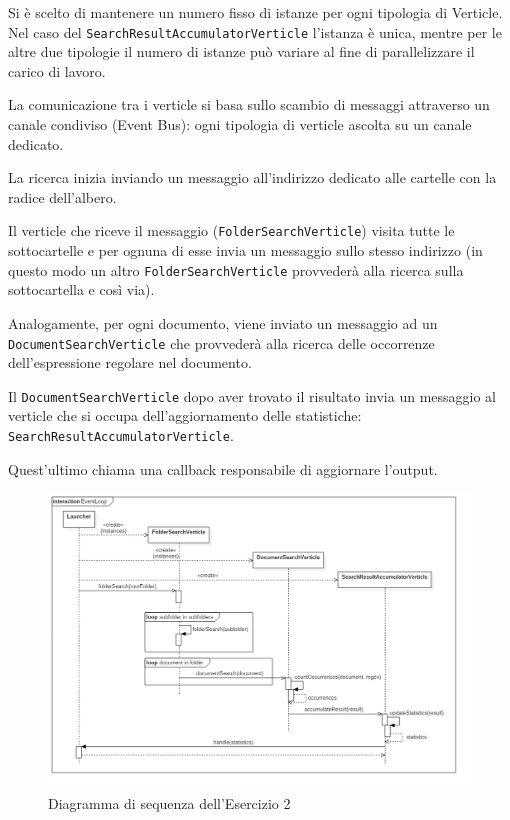 \documentclass[a4paper]{article}
\begin{document}
Si \`e scelto di mantenere un numero fisso di istanze per ogni tipologia di Verticle.
%
Nel caso del \texttt{SearchResultAccumulatorVerticle} l'istanza \`e unica, mentre per le altre due tipologie il numero di istanze pu\`o variare al fine di parallelizzare il carico di lavoro.

La comunicazione tra i verticle si basa sullo scambio di messaggi attraverso un canale condiviso (Event Bus): ogni tipologia di verticle ascolta su un canale dedicato.

La ricerca inizia inviando un messaggio all'indirizzo dedicato alle cartelle con la radice dell'albero.

Il verticle che riceve il messaggio (\texttt{FolderSearchVerticle}) visita tutte le sottocartelle e per ognuna di esse invia un messaggio sullo stesso indirizzo (in questo modo un altro \texttt{FolderSearchVerticle} provveder\`a alla ricerca sulla sottocartella e cos\`i via).

Analogamente, per ogni documento, viene inviato un messaggio ad un \texttt{DocumentSearchVerticle} che provveder\`a alla ricerca delle occorrenze dell'espressione regolare nel documento.

Il \texttt{DocumentSearchVerticle} dopo aver trovato il risultato invia un messaggio al verticle che si occupa dell'aggiornamento delle statistiche: \texttt{SearchResultAccumulatorVerticle}.

Quest'ultimo chiama una callback responsabile di aggiornare l'output.

\begin{figure}[H]

    \centering

    \includegraphics[width=\linewidth, height=\textheight,keepaspectratio]{EventLoop}

    \caption{Diagramma di sequenza dell'Esercizio 2}

    \label{fig:event-loop}

\end{figure}
\end{document}
